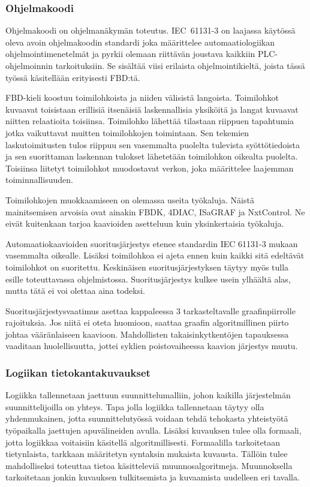\documentclass[finnish,12pt]{article}
\begin{document}
		\subsubsection{Ohjelmakoodi}

Ohjelmakoodi on ohjelmanäkymän toteutus.
IEC~61131-3 on laajassa käytössä oleva avoin ohjelmakoodin standardi joka määrittelee automaatiologiikan ohjelmointimenetelmät ja pyrkii olemaan riittävän joustava kaikkiin PLC-ohjelmoinnin tarkoituksiin.
Se sisältää viisi erilaista ohjelmointikieltä, joista tässä työssä käsitellään erityisesti FBD:tä. \cite{RefWorks:62}

FBD-kieli koostuu toimilohkoista ja niiden välisistä langoista.
Toimilohkot kuvaavat toisistaan erillisiä itsenäisiä laskennallisia yksiköitä ja langat kuvaavat niitten relaatioita toisiinsa.
Toimilohko lähettää tilastaan riippuen tapahtumia jotka vaikuttavat muitten toimilohkojen toimintaan.
Sen tekemien laskutoimitusten tulos riippuu sen vasemmalta puolelta tulevista syöttötiedoista ja sen suorittaman laskennan tulokset lähetetään toimilohkon oikealta puolelta.
Toisiinsa liitetyt toimilohkot muodostavat verkon, joka määrittelee laajemman toiminnallisuuden. \cite{RefWorks:55}

Toimilohkojen muokkaamiseen on olemassa useita työkaluja.
Näistä mainitsemisen arvoisia ovat ainakin FBDK, 4DIAC, ISaGRAF ja NxtControl.
Ne eivät kuitenkaan tarjoa kaavioiden asetteluun kuin yksinkertaisia työkaluja. \cite{RefWorks:35}

Automaatiokaavioiden suoritusjärjestys etenee standardin IEC 61131-3 mukaan vasemmalta oikealle.
Lisäksi toimilohkoa ei ajeta ennen kuin kaikki sitä edeltävät toimilohkot on suoritettu.
Keskinäisen suoritusjärjestyksen täytyy myös tulla esille toteuttavassa ohjelmistossa.
Suoritusjärjestys kulkee usein ylhäältä alas, mutta tätä ei voi olettaa aina todeksi. \cite{RefWorks:62}

Suoritusjärjestysvaatimus asettaa kappaleessa 3 tarkasteltavalle graafinpiirrolle rajoituksia.
Jos niitä ei oteta huomioon, saattaa graafin algoritmillinen piirto johtaa vääränlaiseen kaavioon.
Mahdollisten takaisinkytkentöjen tapauksessa vaaditaan huolellisuutta, jottei syklien poistovaiheessa kaavion järjestys muutu.


		\subsubsection{Logiikan tietokantakuvaukset}

Logiikka tallennetaan jaettuun suunnittelumalliin, johon kaikilla järjestelmän suunnittelijoilla on yhteys.
Tapa jolla logiikka tallennetaan täytyy olla yhdenmukainen, jotta suunnittelutyössä voidaan tehdä tehokasta yhteistyötä työpaikalla jaettujen apuvälineiden avulla.
Lisäksi kuvauksen tulee olla formaali, jotta logiikkaa voitaisiin käsitellä algoritmillisesti.
Formaalilla tarkoitetaan tietynlaista, tarkkaan määritetyn syntaksin mukaista kuvausta.
Tällöin tulee mahdolliseksi toteuttaa tietoa käsitteleviä muunnosalgoritmeja.
Muunnoksella tarkoitetaan jonkin kuvauksen tulkitsemista ja kuvaamista uudelleen eri tavalla.
\end{document}
